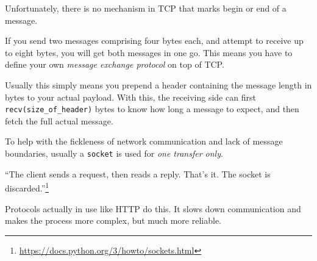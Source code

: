 \begin{frame}
%
\vspace{-6pt}
\begin{hintbox}
\footnotesize
Unfortunately, there is no mechanism in TCP that marks begin or end of a message.

If you send two messages comprising four bytes each, and attempt to receive up to eight bytes, you will get both messages in one go.
This means you have to define your own \emph{message exchange protocol} on top of TCP. 

Usually this simply means you prepend a header containing the message length in bytes to your actual payload.
With this, the receiving side can first \texttt{recv(size\_of\_header)}  bytes to know how long a message to expect, and then fetch the full actual message.
\end{hintbox}
%
\pause
%
\begin{hintbox}
\footnotesize
To help with the fickleness of network communication and lack of message boundaries, usually a \texttt{socket} is used for \emph{one transfer only}. 

\enquote{The client sends a request, then reads a reply. That’s it. The socket is discarded.}\footnote{\url{https://docs.python.org/3/howto/sockets.html}}

Protocols actually in use like HTTP do this. It slows down communication and makes the process more complex, but much more reliable.
\end{hintbox}
%
\end{frame}


